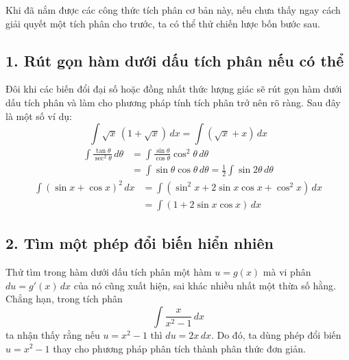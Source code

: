 \documentclass[12pt,a4paper]{article}
\begin{document}
Khi đã nắm được các công thức tích phân cơ bản này, nếu chưa thấy ngay cách giải quyết một tích phân cho trước, ta có thể thử chiến lược bốn bước sau.

\subsection*{1. Rút gọn hàm dưới dấu tích phân nếu có thể}
Đôi khi các biến đổi đại số hoặc đồng nhất thức lượng giác sẽ rút gọn hàm dưới dấu tích phân và làm cho phương pháp tính tích phân trở nên rõ ràng. Sau đây là một số ví dụ:
\[\int\sqrt{x}\,(1+\sqrt{x})\,dx=\int(\sqrt{x}+x)\,dx\]
\begin{align*}
\int\frac{\tan\theta}{\sec^2\theta}\,d\theta
&=\int\frac{\sin\theta}{\cos\theta}\cos^2\theta\,d\theta\\
&=\int\sin\theta\cos\theta\,d\theta
=\frac12\int\sin2\theta\,d\theta
\end{align*}
\begin{align*}
\int(\sin x+\cos x)^2\,dx
&=\int(\sin^2x+2\sin x\cos x+\cos^2x)\,dx\\
&=\int(1+2\sin x\cos x)\,dx
\end{align*}

\subsection*{2. Tìm một phép đổi biến hiển nhiên}
Thử tìm trong hàm dưới dấu tích phân một hàm $u=g(x)$ mà vi phân $du=g'(x)\,dx$ của nó cũng xuất hiện, sai khác nhiều nhất một thừa số hằng. Chẳng hạn, trong tích phân
\[\int\frac{x}{x^2-1}\,dx\]
ta nhận thấy rằng nếu $u=x^2-1$ thì $du=2x\,dx$. Do đó, ta dùng phép đổi biến $u=x^2-1$ thay cho phương pháp phân tích thành phân thức đơn giản.
\end{document}
